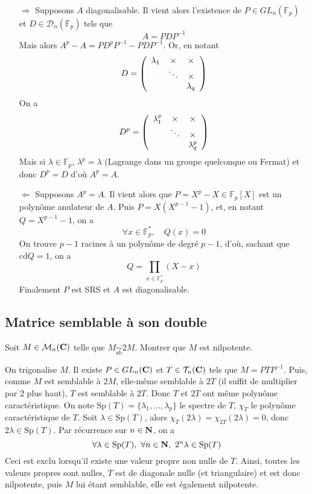 \begin{correction}
	\begin{itemize}
		\item[$\boxed{\Rightarrow}$] Supposons $A$ diagonalisable. Il vient alors l'existence de $P\in GL_n(\mathbb F_p)$ et $D\in \mathcal D_n(\mathbb F_p)$ tels que \[A=PDP^{-1}\]
		Mais alors $A^p-A=PD^pP^{-1}-PDP^{-1}$. Or, en notant 
		\[
		D = \left(\begin{array}{c c c}
			\lambda_1 & \times &\times \\
			& \ddots & \times\\
			& & \lambda_q
		\end{array}\right)
		\]
		On a \[
		D^p=\left(\begin{array}{c c c}
			\lambda_1^p & \times&\times\\
			& \ddots & \times\\
			& & \lambda_q^p
		\end{array}\right)
		\]
		Mais si $\lambda\in\mathbb F_p$, $\lambda^p=\lambda$ (Lagrange dans un groupe quelconque ou Fermat) et donc $D^p=D$ d'où $A^p=A$.
		\item[$\boxed{\Leftarrow}$] Supposons $A^p=A$. Il vient alors que $P=X^p-X\in\mathbb F_p[X]$ est un polynôme anulateur de $A$. Puis $P = X(X^{p-1}-1)$, et, en notant $Q=X^{p-1}-1$, on a \[\forall x\in\mathbb F_p^*,\quad Q(x)=0\]
		On trouve $p-1$ racines à un polynôme de degré $p-1$, d'où, sachant que $\text{cd}Q=1$, on a \[Q=\prod_{x\in\mathbb F_p^*}(X-x)\]
		Finalement $P$ est SRS et $A$ est diagonalisable.

	\end{itemize}
\end{correction}

\subsection{Matrice semblable à son double}
\begin{exercice}
	 Soit $M\in\mathcal M_n(\operatorname{\mathbf{C}})$ telle que $M\underset{\text{sb}}{\sim}2M$. Montrer que $M$ est nilpotente.
\end{exercice}

\begin{correction}
	On trigonalise $M$. Il existe $P\in GL_n(\operatorname{\mathbf{C}})$ et $T\in \mathcal T_n(\operatorname{\mathbf{C}})$ tels que $M=PTP^{-1}$. Puis, comme $M$ est semblable à $2M$, elle-même semblable à $2T$ (il suffit de multiplier par $2$ plus haut), $T$ est semblable à $2T$. Donc $T$ et $2T$ ont même polynôme caractéristique. On note $\text{Sp}(T)=\lbrace \lambda_1,\dots,\lambda_p\rbrace$ le spectre de $T$, $\chi_T$ le polynôme caractéristique de $T$. Soit $\lambda\in \text{Sp}(T)$, alors $\chi_T(2\lambda)=\chi_{2T}(2\lambda)=0$, donc $2\lambda \in \text{Sp}(T)$. Par récurrence sur $n\in\operatorname{\mathbf{N}}$, on a \[\forall \lambda \in \text{Sp}(T),\ \forall n\in\operatorname{\mathbf{N}},\ 2^n\lambda\in\text{Sp}(T)\]
	Ceci est exclu lorsqu'il existe une valeur propre non nulle de $T$. Ainsi, toutes les valeurs propres sont nulles, $T$ est de diagonale nulle (et triangulaire) et est donc nilpotente, puis $M$ lui étant semblable, elle est également nilpotente.
\end{correction}


